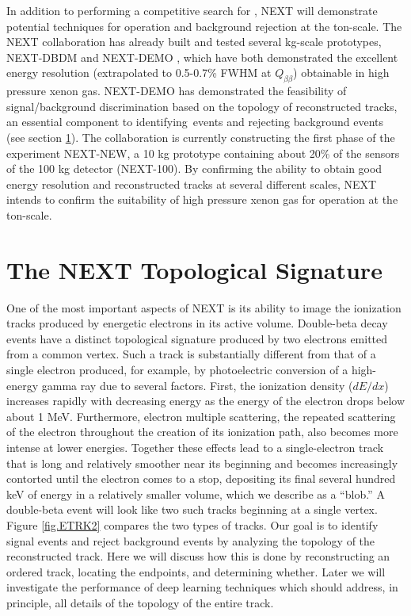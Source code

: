 \documentclass[a4paper,11pt]{article}
\begin{document}
In addition to performing a competitive search for \bbonu, NEXT will demonstrate potential 
techniques for operation and background rejection at the ton-scale.  The NEXT collaboration has already built and tested several kg-scale prototypes, NEXT-DBDM \cite{Alvarez:2012kua} and
NEXT-DEMO \cite{Alvarez:2012xda,Alvarez:2012kua,Alvarez:2013gxa,Lorca:2014sra}, which have both demonstrated the excellent energy resolution (extrapolated to 0.5-0.7\% FWHM at
$Q_{\beta\beta}$) obtainable in high pressure xenon gas.  NEXT-DEMO has demonstrated the feasibility of signal/background discrimination based on the topology of reconstructed tracks,
an essential component to identifying \bbonu\,events and rejecting background events (see section \ref{sec:topology}).  The collaboration is currently constructing the first phase of the experiment NEXT-NEW, a 10 kg prototype 
containing about 20\% of the sensors of the 100 kg detector (NEXT-100).  By confirming the ability to obtain good energy resolution and reconstructed tracks at several different scales, NEXT 
intends to confirm the suitability of high pressure xenon gas for operation at the ton-scale.

\section{The NEXT Topological Signature}\label{sec:topology}
One of the most important aspects of NEXT is its ability to image the ionization tracks produced by energetic electrons in its active volume.  Double-beta decay events have a distinct
topological signature produced by two electrons emitted from a common vertex.  Such a track is substantially different from that of a single electron produced, for example, by photoelectric
conversion of a high-energy gamma ray due to several factors.  First, the ionization density ($dE/dx$) increases rapidly with decreasing energy as the energy of the electron drops below about 1 MeV.  Furthermore, electron multiple scattering, the repeated scattering of the electron throughout the creation of its ionization path, also becomes more intense at lower energies.  Together
these effects lead to a single-electron track that is long and relatively smoother near its beginning and becomes increasingly contorted until the electron comes to a stop, depositing
its final several hundred keV of energy in a relatively smaller volume, which we describe as a ``blob.''  A double-beta event will look like two such tracks beginning at a single vertex.  Figure \ref{fig.ETRK2} compares the two types of
tracks.  Our goal is to identify signal events and reject background events by analyzing the topology of the reconstructed track.  Here we will discuss how this is done by reconstructing an ordered
track, locating the endpoints, and determining whether.  Later we will investigate the performance of deep learning techniques which should address, in principle, all details of the topology 
of the entire track.
\end{document}
